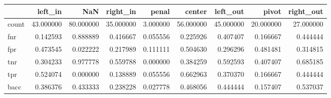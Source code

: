 \begin{tabular}{lrrrrrrrr}
\toprule
{} &    left\_in &        NaN &   right\_in &     penal &     center &   left\_out &      pivot &  right\_out \\
\midrule
count &  43.000000 &  80.000000 &  35.000000 &  3.000000 &  56.000000 &  45.000000 &  20.000000 &  27.000000 \\
fnr   &   0.142593 &   0.888889 &   0.416667 &  0.055556 &   0.225926 &   0.407407 &   0.166667 &   0.444444 \\
fpr   &   0.473545 &   0.022222 &   0.217989 &  0.111111 &   0.504630 &   0.296296 &   0.481481 &   0.314815 \\
tnr   &   0.304233 &   0.977778 &   0.559788 &  0.000000 &   0.384259 &   0.592593 &   0.407407 &   0.685185 \\
tpr   &   0.524074 &   0.000000 &   0.138889 &  0.055556 &   0.662963 &   0.370370 &   0.166667 &   0.444444 \\
bacc  &   0.386376 &   0.433333 &   0.238228 &  0.027778 &   0.468056 &   0.444444 &   0.157407 &   0.537037 \\
\bottomrule
\end{tabular}
